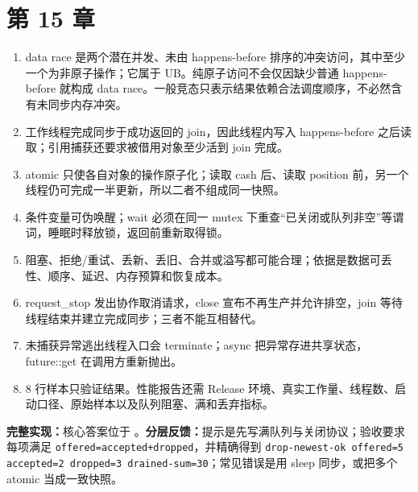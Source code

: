 \section{第 15 章}
\begin{enumerate}
  \item data race 是两个潜在并发、未由 happens-before 排序的冲突访问，其中至少一个为非原子操作；它属于 UB。纯原子访问不会仅因缺少普通 happens-before 就构成 data race。一般竞态只表示结果依赖合法调度顺序，不必然含有未同步内存冲突。
  \item 工作线程完成同步于成功返回的 join，因此线程内写入 happens-before 之后读取；引用捕获还要求被借用对象至少活到 join 完成。
  \item atomic 只使各自对象的操作原子化；读取 cash 后、读取 position 前，另一个线程仍可完成一半更新，所以二者不组成同一快照。
  \item 条件变量可伪唤醒；wait 必须在同一 mutex 下重查“已关闭或队列非空”等谓词，睡眠时释放锁，返回前重新取得锁。
  \item 阻塞、拒绝/重试、丢新、丢旧、合并或溢写都可能合理；依据是数据可丢性、顺序、延迟、内存预算和恢复成本。
  \item request\_stop 发出协作取消请求，close 宣布不再生产并允许排空，join 等待线程结束并建立完成同步；三者不能互相替代。
  \item 未捕获异常逃出线程入口会 terminate；async 把异常存进共享状态，future::get 在调用方重新抛出。
  \item 8 行样本只验证结果。性能报告还需 Release 环境、真实工作量、线程数、启动口径、原始样本以及队列阻塞、满和丢弃指标。
\end{enumerate}

\noindent\textbf{完整实现：}核心答案位于 。\textbf{分层反馈：}提示是先写满队列与关闭协议；验收要求每项满足 \texttt{offered=accepted+dropped}，并精确得到 \texttt{drop-newest-ok offered=5 accepted=2 dropped=3 drained-sum=30}；常见错误是用 sleep 同步，或把多个 atomic 当成一致快照。

